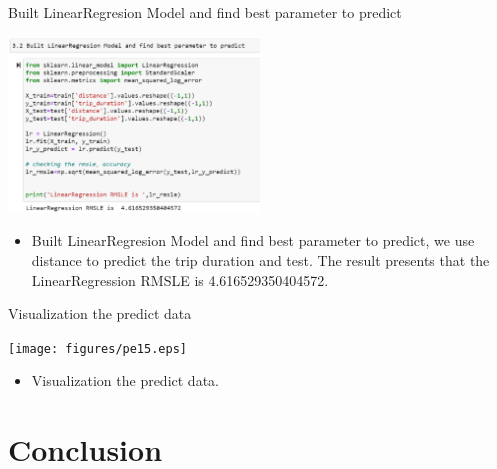 \documentclass[
 size=14pt,
 paper=smartboard,  %
 mode=present, 		%
 display=slides, 	%
 style=tuliplab,  	%
 pauseslide,
 fleqn,leqno]{powerdot}
\begin{document}
\begin{slide}{Built LinearRegresion Model and find best parameter to predict }
	{\begin{flushleft}
		\includegraphics[width=0.5\textwidth]{figures/pe14.eps}
	\end{flushleft}
}
	
	\begin{itemize}
		\item
		\smallskip
		Built LinearRegresion Model and find best parameter to predict, we use distance to predict the trip duration and test. The result presents that the LinearRegression RMSLE is  4.616529350404572. 
		
	\end{itemize}
	
\end{slide}


\begin{slide}{Visualization the predict data}
	{\begin{flushleft}
			\texttt{[image: figures/pe15.eps]}
		\end{flushleft}
	}
	
	\begin{itemize}
		\item
		\smallskip
		Visualization the predict data.
		
	\end{itemize}
	
\end{slide}





\section{Conclusion}
\end{document}
